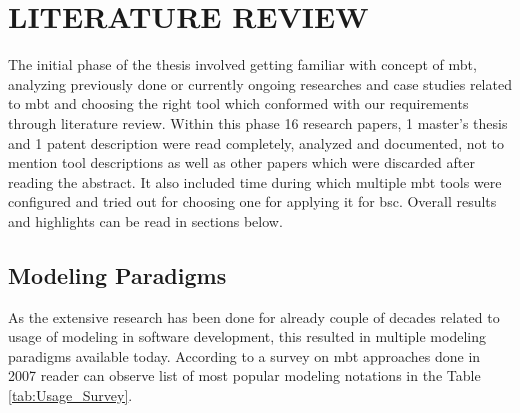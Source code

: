 \chapter{LITERATURE REVIEW}
\label{chapter:literature_review}

\par
The initial phase of the thesis involved getting familiar with concept of \acrshort{mbt}, analyzing previously done or currently ongoing researches and case studies related to \acrshort{mbt} and choosing the right tool which conformed with our requirements through literature review. Within this phase 16 research papers, 1 master's thesis and 1 patent description were read completely, analyzed and documented, not to mention tool descriptions as well as other papers which were discarded after reading the abstract. It also included time during which multiple \acrshort{mbt} tools were configured and tried out for choosing one for applying it for \acrshort{bsc}. Overall results and highlights can be read in sections below.

\section{Modeling Paradigms}

\par
As the extensive research has been done for already couple of decades related to usage of modeling in software development, this resulted in multiple modeling paradigms available today. According to a survey on \acrshort{mbt} approaches done in 2007 \cite{Survey} reader can observe list of most popular modeling notations in the Table \ref{tab:Usage_Survey}. 

